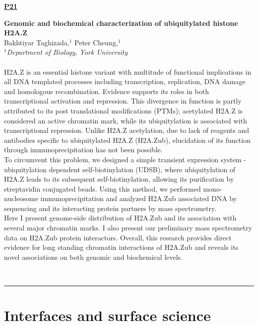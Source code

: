 \documentclass[titlepage,oneside,openany,10pt]{book}
\newenvironment{posterabs}[4] %
        {
	\begin{flushright}
                \underline{\textbf{#4}}
        \end{flushright}
        \textbf{#1}\\%
        #2\\%
        \textit{#3}\\\\%
        }
        {
        \\
        \noindent\rule{15cm}{0.5pt}%
        }
\begin{document}
\vspace{1cm}

\begin{posterabs}
	{Genomic and biochemical characterization of ubiquitylated histone H2A.Z}
	{Bakhtiyar Taghizada,$^{1}$ Peter Cheung,$^{1}$}
	{
	$^1$Department of Biology, York University
	}
	{P21}
	H2A.Z is an essential histone variant with multitude of functional implications in all DNA templated processes including transcription, replication, DNA damage and homologous recombination. Evidence supports its roles in both transcriptional activation and repression. This divergence in function is partly attributed to its post translational modifications (PTMs); acetylated H2A.Z is considered an active chromatin mark, while its ubiquitylation is associated with transcriptional repression. Unlike H2A.Z acetylation, due to lack of reagents and antibodies specific to ubiquitylated H2A.Z (H2A.Zub), elucidation of its function through immunoprecipitation has not been possible.\\To circumvent this problem, we designed a simple transient expression system - ubiquitylation dependent self-biotinylation (UDSB), where ubiquitylation of H2A.Z leads to its subsequent self-biotinylation, allowing its purification by streptavidin conjugated beads. Using this method, we performed mono-nucleosome immunoprecipitation and analyzed H2A.Zub associated DNA by sequencing and its interacting protein partners by mass spectrometry.\\Here I present genome-side distribution of H2A.Zub and its association with several major chromatin marks. I also present our preliminary mass spectrometry data on H2A.Zub protein interactors. Overall, this research provides direct evidence for long standing chromatin interactions of H2A.Zub and reveals its novel associations on both genomic and biochemical levels.
	\label{TaghizadaB}
\end{posterabs}
	

\newpage

\section*{Interfaces and surface science}
\label{sec:surf}
\end{document}
